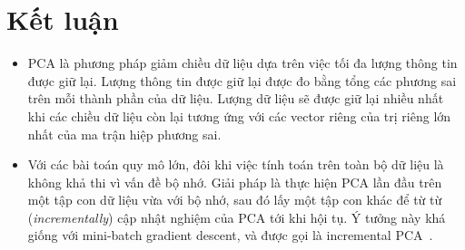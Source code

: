 \section{Kết luận}
\begin{itemize}
    \item PCA là phương pháp giảm chiều dữ liệu dựa trên việc tối đa lượng
          thông tin được giữ lại. Lượng thông tin được giữ lại được đo bằng tổng các
          phương sai trên mỗi thành phần của dữ liệu. Lượng dữ liệu sẽ được giữ lại nhiều
          nhất khi các chiều dữ liệu còn lại tương ứng với các vector riêng của trị riêng
          lớn nhất của ma trận hiệp phương sai.

    \item Với các bài toán quy mô lớn, đôi khi việc tính toán trên toàn bộ dữ liệu
          là không khả thi vì vấn đề bộ nhớ. Giải pháp là thực hiện PCA lần đầu
          trên một tập con dữ liệu vừa với bộ nhớ, sau đó lấy một tập con khác để {từ từ} (\textit{incrementally}) cập nhật nghiệm của PCA tới khi hội
          tụ. Ý tưởng này khá giống với mini-batch gradient descent, và được gọi là
          incremental PCA~\cite{zhao2006novel}.


\end{itemize}

